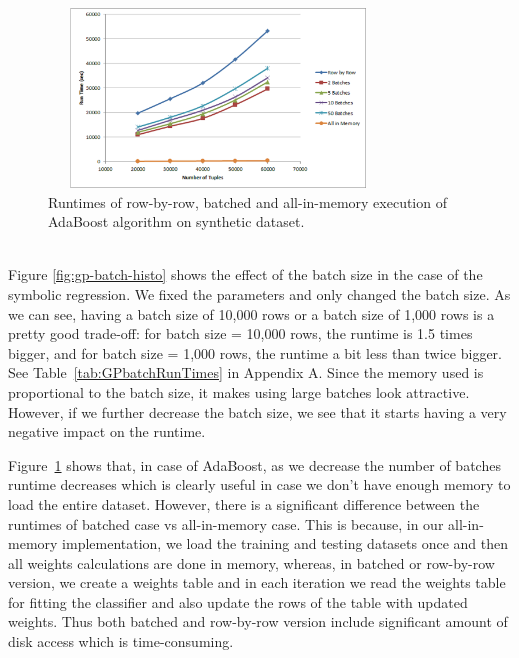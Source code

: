 \begin{figure}[ht]
\centering
\includegraphics[width=0.8\textwidth,height=180px]{ada3.png}
\caption{Runtimes of row-by-row, batched and all-in-memory execution of AdaBoost algorithm on synthetic dataset.}
\label{fig:adabatch2}
\end{figure}


~~\\
Figure \ref{fig:gp-batch-histo} shows the effect of the batch size in the case of the symbolic regression. We fixed the parameters and only changed the batch size. As we can see, having a batch size of 10,000 rows or a batch size of 1,000 rows is a pretty good trade-off: for batch size = 10,000 rows, the runtime is 1.5  times bigger, and for batch size = 1,000 rows, the runtime a bit less than twice bigger. See Table~\ref{tab:GPbatchRunTimes} in Appendix A. Since the memory used is proportional to the batch size, it makes using large batches look attractive. However, if we further decrease the batch size, we see that it starts having a very negative impact on the runtime. 

Figure~\ref{fig:adabatch2} shows that, in case of AdaBoost, as we decrease the number of batches runtime decreases which is clearly useful in case we don't have enough memory to load the entire dataset. However, there is a significant difference between the runtimes of batched case vs all-in-memory case. This is because, in our all-in-memory implementation, we load the training and testing datasets once and then all weights calculations are done in memory, whereas, in batched or row-by-row version, we create a weights table and in each iteration we read the weights table for fitting the classifier and also update the rows of the table with updated weights. Thus both batched and row-by-row version include significant amount of disk access which is time-consuming. 


